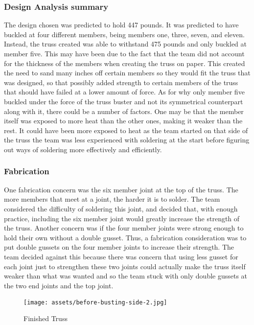 \documentclass{article}
\let\Oldsubsubsection\subsubsection
\renewcommand{\subsubsection}{\FloatBarrier\Oldsubsubsection}
\begin{document}
\subsubsection{Design Analysis summary}

The design chosen was predicted to hold 447 pounds. It was predicted to have buckled at four different members, being members one, three, seven, and eleven. Instead, the truss created was able to withstand 475 pounds and only buckled at member five. This may have been due to the fact that the team did not account for the thickness of the members when creating the truss on paper. This created the need to sand many inches off certain members so they would fit the truss that was designed, so that possibly added strength to certain members of the truss that should have failed at a lower amount of force. As for why only member five buckled under the force of the truss buster and not its symmetrical counterpart along with it, there could be a number of factors. One may be that the member itself was exposed to more heat than the other ones, making it weaker than the rest. It could have been more exposed to heat as the team started on that side of the truss the team was less experienced with soldering at the start before figuring out ways of soldering more effectively and efficiently.

\subsubsection{Fabrication}

One fabrication concern was the six member joint at the top of the truss. The more members that meet at a joint, the harder it is to solder. The team considered the difficulty of soldering this joint, and decided that, with enough practice, including the six member joint would greatly increase the strength of the truss. Another concern was if the four member joints were strong enough to hold their own without a double gusset. Thus, a fabrication consideration was to put double gussets on the four member joints to increase their strength. The team decided against this because there was concern that using less gusset for each joint just to strengthen these two joints could actually make the truss itself weaker than what was wanted and so the team stuck with only double gussets at the two end joints and the top joint. 

\begin{figure}[!htb]
  \centering
  \texttt{[image: assets/before-busting-side-2.jpg]}
  \label{fig:finished-truss}
  \caption{Finished Truss}
\end{figure}
\end{document}
